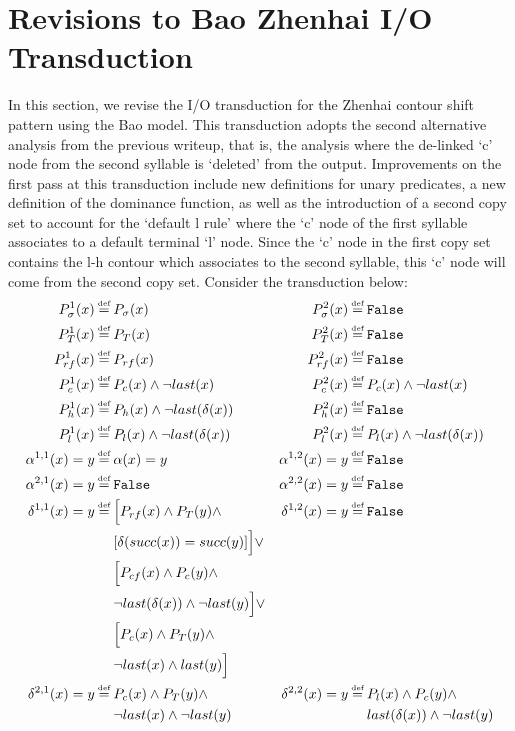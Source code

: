 \documentclass{article}
\newcommand\myeq{\mathrel{\stackrel{\makebox[0pt]{\mbox{\normalfont\tiny def}}}{=}}}
\begin{document}
\section{Revisions to Bao Zhenhai I/O Transduction}
In this section, we revise the I/O transduction for the Zhenhai contour shift pattern using the Bao model. This transduction adopts the second alternative analysis from the previous writeup, that is, the analysis where the de-linked `c' node from the second syllable is `deleted' from the output. Improvements on the first pass at this transduction include new definitions for unary predicates, a new definition of the dominance function, as well as the introduction of a second copy set to account for the `default l rule' where the `c' node of the first syllable associates to a default terminal `l' node. Since the `c' node in the first copy set contains the l-h contour which associates to the second syllable, this `c' node will come from the second copy set. Consider the transduction below:
\begin{equation}
\begin{aligned}
P_{\sigma}^{1}(x)&\myeq P_{\sigma}(x) & P_{\sigma}^{2}(x)&\myeq \mathtt{False}  \\
P_{T}^{1}(x)&\myeq P_{T}(x) & P_{T}^{2}(x)&\myeq \mathtt{False} \\
P_{rf}^{1}(x)&\myeq P_{rf}(x) & P_{rf}^{2}(x)&\myeq \mathtt{False} \\
P_{c}^{1}(x)&\myeq P_{c}(x) \land \neg last(x) & P_{c}^{2}(x)&\myeq P_{c}(x) \land \neg last(x) \\
P_{h}^{1}(x)&\myeq P_{h}(x)\land \neg last(\delta(x)) & P_{h}^{2}(x)&\myeq \mathtt{False} \\
P_{l}^{1}(x)&\myeq P_{l}(x) \land \neg last(\delta(x)) & P_{l}^{2}(x)&\myeq P_{l}(x) \land \neg last(\delta(x)) \\
\alpha^{1,1}(x)=y&\myeq \alpha(x)=y & \alpha^{1,2}(x)=y&\myeq \mathtt{False} \\
\alpha^{2,1}(x)=y&\myeq \mathtt{False} & \alpha^{2,2}(x)=y&\myeq \mathtt{False} \\
\delta^{1,1}(x)=y&\myeq \Big[P_{rf}(x)\land P_{T}(y)\land  & \delta^{1,2}(x)=y&\myeq \mathtt{False} \\
&\quad \, \, [\delta(succ(x))=succ(y)]\Big] \lor \\
&\quad \, \, \Big[P_{cf}(x)\land P_{c}(y)\land \\
&\quad \, \, \neg last(\delta(x))\land \neg last(y)\Big]\lor \\
&\quad \, \, \Big[P_{c}(x)\land P_{T}(y)\land \\
&\quad \, \, \neg last(x)\land last(y)\Big] \\
\delta^{2,1}(x)=y&\myeq P_{c}(x)\land P_{T}(y) \land  & \delta^{2,2}(x)=y&\myeq P_{l}(x)\land P_{c}(y)\land  \\
&\quad \, \, \neg last(x)\land\neg last(y) & &\quad\,\, last(\delta(x))\land \neg last(y) \\
\end{aligned}
\end{equation}
\end{document}
